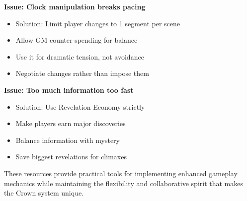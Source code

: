 \textbf{Issue: Clock manipulation breaks pacing}
\begin{itemize}
\item Solution: Limit player changes to 1 segment per scene
\item Allow GM counter-spending for balance
\item Use it for dramatic tension, not avoidance
\item Negotiate changes rather than impose them
\end{itemize}

\textbf{Issue: Too much information too fast}
\begin{itemize}
\item Solution: Use Revelation Economy strictly
\item Make players earn major discoveries
\item Balance information with mystery
\item Save biggest revelations for climaxes
\end{itemize}

These resources provide practical tools for implementing enhanced gameplay mechanics while maintaining the flexibility and collaborative spirit that makes the Crown system unique.
